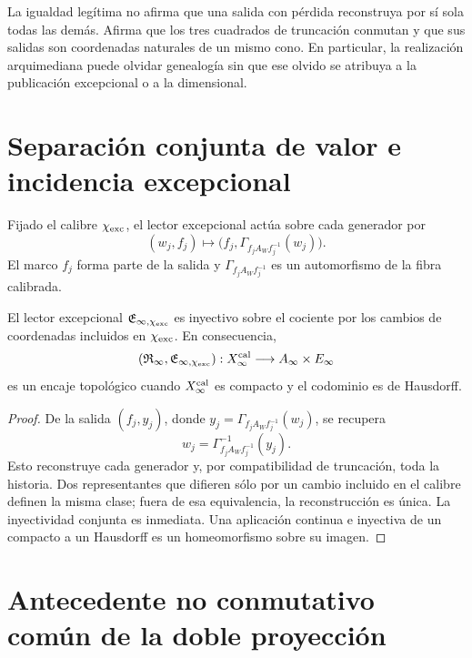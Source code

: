 La igualdad legítima no afirma que una salida con pérdida reconstruya por sí
sola todas las demás. Afirma que los tres cuadrados de truncación conmutan y
que sus salidas son coordenadas naturales de un mismo cono. En particular,
la realización arquimediana puede olvidar genealogía sin que ese olvido se
atribuya a la publicación excepcional o a la dimensional.

\section{Separación conjunta de valor e incidencia excepcional}
\label{sec:cpe-separacion-conjunta}

Fijado el calibre \(\chi_{\rm exc}\), el lector excepcional actúa sobre cada
generador por
\begin{equation}
 (w_j,f_j)\longmapsto
 \bigl(f_j,\Gamma_{f_jA_Wf_j^{-1}}(w_j)\bigr).
 \label{eq:cpe-lector-excepcional-generador}
\end{equation}
El marco \(f_j\) forma parte de la salida y
\(\Gamma_{f_jA_Wf_j^{-1}}\) es un automorfismo de la fibra calibrada.

\begin{theorem}
\label{thm:cpe-separacion-calibrada}
El lector excepcional
\(\mathfrak E_{\infty,\chi_{\rm exc}}\) es inyectivo sobre el cociente por
los cambios de coordenadas incluidos en \(\chi_{\rm exc}\). En consecuencia,
\[
 (\mathfrak R_\infty,\mathfrak E_{\infty,\chi_{\rm exc}})
 :X_\infty^{\rm cal}\longrightarrow
 A_\infty\times E_\infty
\]
es un encaje topológico cuando \(X_\infty^{\rm cal}\) es compacto y el
codominio es de Hausdorff.
\end{theorem}

\begin{proof}
De la salida \((f_j,y_j)\), donde
\(y_j=\Gamma_{f_jA_Wf_j^{-1}}(w_j)\), se recupera
\[
 w_j=\Gamma_{f_jA_Wf_j^{-1}}^{-1}(y_j).
\]
Esto reconstruye cada generador y, por compatibilidad de truncación, toda la
historia. Dos representantes que difieren sólo por un cambio incluido en el
calibre definen la misma clase; fuera de esa equivalencia, la reconstrucción
es única. La inyectividad conjunta es inmediata. Una aplicación continua e
inyectiva de un compacto a un Hausdorff es un homeomorfismo sobre su imagen.
\end{proof}

\section{Antecedente no conmutativo común de la doble proyección}
\label{sec:cpe-antecedente-ucp}

